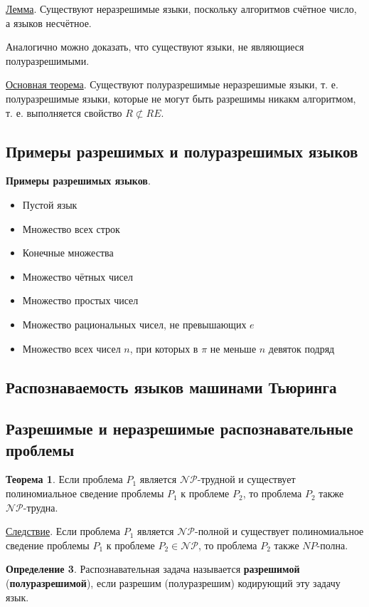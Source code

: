 \underline{Лемма}. Существуют неразрешимые языки, поскольку алгоритмов счётное число, а языков несчётное.

Аналогично можно доказать, что существуют языки, не являющиеся полуразрешимыми.

\underline{Основная теорема}. Существуют полуразрешимые неразрешимые языки, т. е. полуразрешимые языки, которые не могут быть разрешимы никакм алгоритмом, т. е. выполняется свойство $R \not \subset RE$.

\subsection{Примеры разрешимых и полуразрешимых языков}
\textbf{Примеры разрешимых языков}.
\begin{itemize}
    \item Пустой язык
    \item Множество всех строк
    \item Конечные множества
    \item Множество чётных чисел
    \item Множество простых чисел
    \item Множество рациональных чисел, не превышающих $e$
    \item Множество всех чисел $n$, при которых в $\pi$ не меньше $n$ девяток подряд
\end{itemize}

\subsection{Распознаваемость языков машинами Тьюринга}

\subsection{Разрешимые и неразрешимые распознавательные проблемы}
\textbf{Теорема 1}. Если проблема $P_1$ является $\mathscr{NP}$-трудной и существует полиномиальное сведение проблемы $P_1$ к проблеме $P_2$, то проблема $P_2$ также $\mathscr{NP}$-трудна.

\underline{Следствие}. Если проблема $P_1$ является $\mathscr{NP}$-полной и существует полиномиальное сведение проблемы $P_1$ к проблеме $P_2 \in \mathscr{NP}$, то проблема $P_2$ также $NP$-полна.

\textbf{Определение 3}. Распознавательная задача называется \textbf{разрешимой} (\textbf{полуразрешимой}), если разрешим (полуразрешим) кодирующий эту задачу язык.

